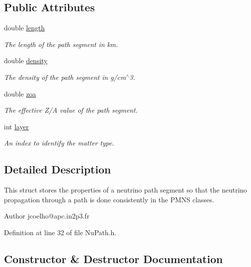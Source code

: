 \subsection*{Public Attributes}
\begin{DoxyCompactItemize}
\item 
double \hyperlink{structOscProb_1_1NuPath_af22660894b6e25cf835500381b155557}{length}
\begin{DoxyCompactList}\small\item\em The length of the path segment in km. \end{DoxyCompactList}\item 
double \hyperlink{structOscProb_1_1NuPath_a54ddd451db69bc54434de3cf18a117ca}{density}
\begin{DoxyCompactList}\small\item\em The density of the path segment in g/cm$^\wedge$3. \end{DoxyCompactList}\item 
double \hyperlink{structOscProb_1_1NuPath_af3213f3691ba83c6bc05f4a3490f6b31}{zoa}
\begin{DoxyCompactList}\small\item\em The effective Z/A value of the path segment. \end{DoxyCompactList}\item 
int \hyperlink{structOscProb_1_1NuPath_a442b160899e554ad1d800989510d5309}{layer}
\begin{DoxyCompactList}\small\item\em An index to identify the matter type. \end{DoxyCompactList}\end{DoxyCompactItemize}


\subsection{Detailed Description}
This struct stores the properties of a neutrino path segment so that the neutrino propagation through a path is done consistently in the P\+M\+NS classes.

\begin{DoxyAuthor}{Author}
jcoelho@apc.\+in2p3.\+fr 
\end{DoxyAuthor}


Definition at line 32 of file Nu\+Path.\+h.



\subsection{Constructor \& Destructor Documentation}
\mbox{\label{structOscProb_1_1NuPath_a1cc885eb24b3152596ac2f8500f81ae6}} 
